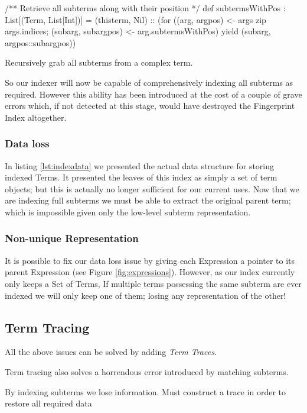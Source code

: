 \begin{listing}[H]
\begin{scalacode}
/** Retrieve all subterms along with their position */
def subtermsWithPos : List[(Term, List[Int])] = 
  (thisterm, Nil) :: (for 
    ((arg,    argpos)    <- args zip args.indices;
     (subarg, subargpos) <- arg.subtermsWithPos)
      yield  (subarg, argpos::subargpos))
\end{scalacode}
\caption{Recursively grab all subterms from a complex term.}
\label{lst:subterms}
\end{listing}

So our indexer will now be capable of comprehensively indexing all subterms as required.
However this ability has been introduced at the cost of a couple of grave errors which,
if not detected at this stage, would have destroyed the Fingerprint Index altogether.

\subsubsection{Data loss}
In listing \ref{lst:indexdata} we presented the actual data structure for storing
indexed Terms. It presented the leaves of this index as simply a set of term objects;
but this is actually no longer sufficient for our current uses. Now that we are indexing full subterms
we must be able to extract the original parent term; which is impossible given only
the low-level subterm representation.

\subsubsection{Non-unique Representation}
It is possible to fix our data loss issue by giving each Expression a pointer
to its parent Expression (see Figure \ref{fig:expressions}). However, as our index currently only keeps a Set of Terms,
If multiple terms possessing the same subterm are ever indexed we will only keep
one of them; losing any representation of the other!


\subsection{Term Tracing}

All the above issues can be solved by adding \emph{Term Traces}.

Term tracing also solves a horrendous error introduced by matching subterms. 

By indexing subterms we lose information. Must construct a trace in order
to restore all required data

